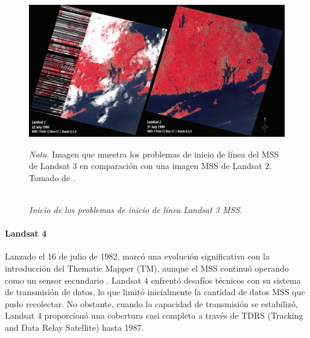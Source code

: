                     \begin{figure}[H] 
                        \caption{\doublespacing \\ \textit{Inicio de los problemas de inicio de línea Landsat 3 MSS.}} 
                        \centering
                        \includegraphics[width=1\linewidth]{2_CAPITULO2/IMG/landsat3.png}
                        \begin{justify}
                            \textit{Nota.} Imagen que muestra los problemas de inicio de línea del MSS de Landsat 3 en comparación con una imagen MSS de Landsat 2. Tomado de \textcite{landsat_legacy}.
                        \end{justify}                    
                        \label{landsat3}
                    \end{figure}

                \paragraph{Landsat 4}
                    Lanzado el 16 de julio de 1982, marcó una evolución significativa con la introducción del Thematic Mapper (TM), aunque el MSS continuó operando como un sensor secundario​​ . Landsat 4 enfrentó desafíos técnicos con su sistema de transmisión de datos, lo que limitó inicialmente la cantidad de datos MSS que pudo recolectar. No obstante, cuando la capacidad de transmisión se estabilizó, Landsat 4 proporcionó una cobertura casi completa a través de TDRS (Tracking and Data Relay Satellite) hasta 1987.

